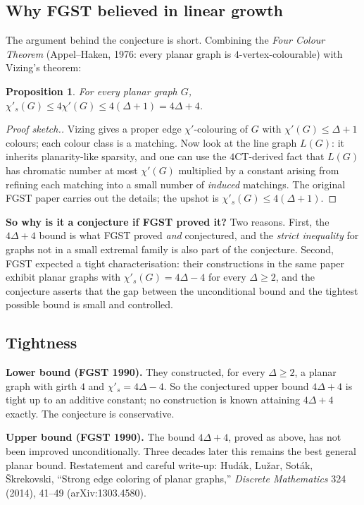\documentclass[11pt]{article}
\newcommand{\sci}{\chi'_s}
\newtheorem*{prop*}{Proposition}
\begin{document}
\subsection*{Why FGST believed in linear growth}

The argument behind the conjecture is short. Combining the
\emph{Four Colour Theorem} (Appel--Haken, 1976: every planar graph is
$4$-vertex-colourable) with Vizing's theorem:

\begin{prop*}
For every planar graph $G$, $\sci(G) \leq 4\chi'(G) \leq 4(\Delta + 1) = 4\Delta + 4$.
\end{prop*}

\begin{proof}[Proof sketch.]
Vizing gives a proper edge $\chi'$-colouring of $G$ with $\chi'(G) \leq \Delta + 1$ colours;
each colour class is a matching. Now look at the line graph $L(G)$:
it inherits planarity-like sparsity, and one can use the $4$CT-derived
fact that $L(G)$ has chromatic number at most $\chi'(G)$ multiplied
by a constant arising from refining each matching into a small number
of \emph{induced} matchings. The original FGST paper carries out the
details; the upshot is $\sci(G) \leq 4(\Delta + 1)$.
\end{proof}

\textbf{So why is it a conjecture if FGST proved it?} Two reasons.
First, the $4\Delta + 4$ bound is what FGST proved \emph{and}
conjectured, and the \emph{strict inequality} for graphs not in a
small extremal family is also part of the conjecture. Second, FGST
expected a tight characterisation: their constructions in the same
paper exhibit planar graphs with $\sci(G) = 4\Delta - 4$ for every
$\Delta \geq 2$, and the conjecture asserts that the gap between the
unconditional bound and the tightest possible bound is small and
controlled.

\subsection*{Tightness}

\textbf{Lower bound (FGST 1990).} They constructed, for every
$\Delta \geq 2$, a planar graph with girth $4$ and
$\sci = 4\Delta - 4$. So the conjectured upper bound $4\Delta + 4$
is tight up to an additive constant; no construction is known
attaining $4\Delta + 4$ exactly. The conjecture is conservative.

\textbf{Upper bound (FGST 1990).} The bound $4\Delta + 4$, proved as
above, has not been improved unconditionally. Three decades later
this remains the best general planar bound. Restatement and
careful write-up: Hud\'ak, Lu\v{z}ar, Sot\'ak, \v{S}krekovski,
``Strong edge coloring of planar graphs,''
\emph{Discrete Mathematics} 324 (2014), 41--49 (arXiv:1303.4580).
\end{document}
